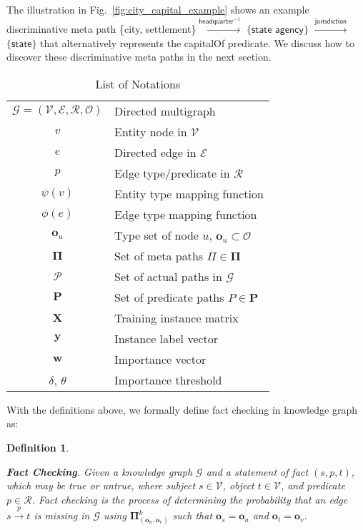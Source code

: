 \documentclass[reprint,twocolumn,showpacs,preprintnumbers,amsmath, aps,pre,amssymb]{revtex4-1}
\newtheorem{definition}{Definition}
\begin{document}
The illustration in Fig.~\ref{fig:city_capital_example} shows an example discriminative meta path \textsf{\{city, settlement\}}$\xrightarrow {\textsf{headquarter}^{-1}}$ $\{\textsf{state agency}\}$ $\xrightarrow{\textsf{jurisdiction}}$ $\{\textsf{state}\}$ that alternatively represents the \textsf{capitalOf} predicate. We discuss how to discover these discriminative meta paths in the next section.

\begin{table}[t]
\centering
\caption{List of Notations}
\begin{tabular}{c l}
\hline
$\mathcal{G}=(\mathcal{V},\mathcal{E},\mathcal{R},\mathcal{O})$ & Directed multigraph \\ 
$v$ & Entity node in $\mathcal{V}$ \\ 
$e$ & Directed edge in $\mathcal{E}$ \\ 
$p$ & Edge type/predicate in $\mathcal{R}$ \\ 
$\psi(v)$ & Entity type mapping function \\ 
$\phi(e)$ & Edge type mapping function \\ 
$\mathbf{o}_u$ & Type set of node $u$, $\mathbf{o}_u \subset \mathcal{O}$ \\ 
$\mathbf{\Pi}$ & Set of meta paths $\Pi\in\mathbf{\Pi}$  \\
$\mathcal{P}$ & Set of actual paths in $\mathcal{G}$\\
$\mathbf{P}$ & Set of predicate paths $P\in\mathbf{P}$ \\
$\mathbf{X}$ & Training instance matrix \\
$\mathbf{y}$ & Instance label vector\\
$\mathbf{w}$ & Importance vector \\
$\delta$, $\theta$ & Importance threshold \\
\hline
\end{tabular}
\label{tab:notation}
\end{table}

With the definitions above, we formally define fact checking in knowledge graph as:


\begin{definition} \label{def:fact_checking}

\textbf{Fact Checking}. Given a knowledge graph $\mathcal{G}$ and a statement of fact $(s, p, t)$, which may be true or untrue, where subject $s \in \mathcal{V}$, object $t \in \mathcal{V}$, and predicate $p \in \mathcal{R}$. Fact checking is the process of determining the probability that an edge $s \xrightarrow{p} t$ is missing in $\mathcal{G}$ using $\mathbf{\Pi}^k_{(\mathbf{o}_u,\mathbf{o}_v)}$ such that $\mathbf{o}_s=\mathbf{o}_u$ and $\mathbf{o}_t=\mathbf{o}_v$.
\end{definition}
\end{document}
